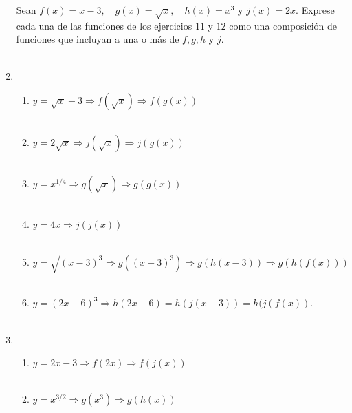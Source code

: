 \begin{enumerate}
Sean $f(x)=x-3, \quad g(x)=\sqrt{x}, \quad h(x)=x^3$ y $j(x)=2x$. Exprese cada una de las funciones de los ejercicios $11$ y $12$ como una composición de funciones que incluyan a una o más de $f,g,h$ y $j$.\\\\

\item
\begin{enumerate}[\bfseries a.]
    
    \item $y=\sqrt{x}-3 \Rightarrow f(\sqrt{x}) \Rightarrow f(g(x))$\\\\

    \item $y=2\sqrt{x} \Rightarrow j(\sqrt{x}) \Rightarrow j(g(x))$\\\\

    \item $y=x^{1/4} \Rightarrow g(\sqrt{x}) \Rightarrow g(g(x))$\\\\

    \item $y=4x \Rightarrow j(j(x))$\\\\

    \item $y=\sqrt{(x-3)^3} \Rightarrow g((x-3)^3) \Rightarrow g(h(x-3)) \Rightarrow g(h(f(x)))$\\\\

    \item $y=(2x-6)^3 \Rightarrow h(2x-6) = h(j(x-3)) = h(j(f(x))$.\\\\ 

\end{enumerate}

\item 
\begin{enumerate}[\bfseries a.]
    
    \item $y=2x-3 \Rightarrow f(2x) \Rightarrow f(j(x))$\\\\
    
    \item $y=x^{3/2} \Rightarrow g(x^3) \Rightarrow g(h(x))$\\\\
    

\end{enumerate}
\end{enumerate}
